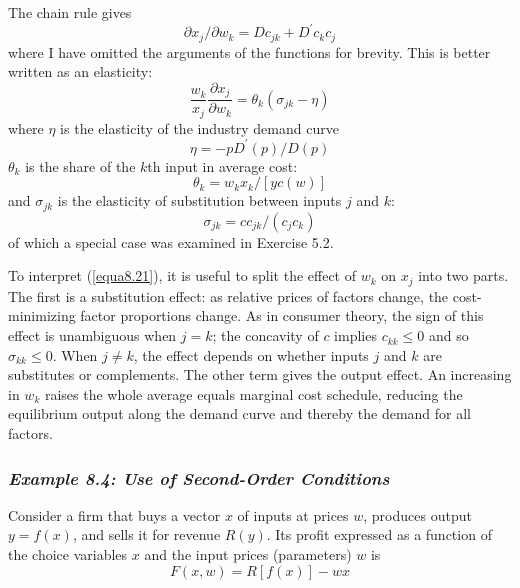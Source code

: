 The chain rule gives
\begin{equation*}   
   \partial x_j / \partial w_k = D c_{jk} + D^\prime c_k c_j
\end{equation*}
where I have omitted the arguments of the functions for brevity. This is better written as an elasticity:
\begin{equation} \label{equa8.21}   
   \dfrac{w_k}{x_j} \dfrac{\partial x_j}{\partial w_k} = \theta_k (\sigma_{jk} - \eta)
\end{equation}
where $\eta$ is the elasticity of the industry demand curve 
\begin{equation*}   
   \eta = - p D^\prime(p) / D(p)
\end{equation*}
$\theta_k$ is the share of the $k$th input in average cost:
\begin{equation*}   
   \theta_k = w_k x_k / [y c(w)]
\end{equation*}
and $\sigma_{jk}$ is the elasticity of substitution between inputs $j$ and $k$:
\begin{equation*}   
   \sigma_{jk} = c c_{jk} / (c_j c_k)
\end{equation*}
of which a special case was examined in Exercise 5.2.

To interpret (\ref{equa8.21}), it is useful to split the effect of $w_k$ on $x_j$ into two parts. The first is a substitution effect: as relative prices of factors change, the cost-minimizing factor proportions change. As in consumer theory, the sign of this effect is unambiguous when $j=k$; the concavity of $c$ implies $c_{kk} \leq 0$ and so $\sigma_{kk} \leq 0$. When $j \neq k$, the effect depends on whether inputs $j$ and $k$ are substitutes or complements. The other term gives the output effect. An increasing in $w_k$ raises the whole average equals marginal cost schedule, reducing the equilibrium output along the demand curve and thereby the demand for all factors.

\subsubsection*{\textit{Example 8.4: Use of Second-Order Conditions}}

Consider a firm that buys a vector $x$ of inputs at prices $w$, produces output $y=f(x)$, and sells it for revenue $R(y)$. Its profit expressed as a function of the choice variables $x$ and the input prices (parameters) $w$ is 
\begin{equation*}   
   F(x,w) = R[ f(x) ] - wx
\end{equation*}

